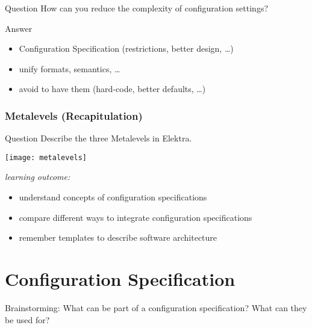 \begin{frame}
	\begin{alertblock}{Question}
	How can you reduce the complexity of configuration settings?
	\end{alertblock}

	\pause
	\begin{exampleblock}{Answer}
	\begin{itemize}
	\item Configuration Specification (restrictions, better design, \dots)
	\item unify formats, semantics, \dots
	\item avoid to have them (hard-code, better defaults, \dots)
	\end{itemize}
	\end{exampleblock}
\end{frame}

\begin{frame}
	\frametitle{Metalevels (Recapitulation)}
	\begin{alertblock}{Question}
	Describe the three Metalevels in Elektra.
	\end{alertblock}

	\pause
	\texttt{[image: metalevels]}
\end{frame}


\begin{frame}
	\textit{learning outcome:}
	\begin{itemize}
		\item understand concepts of configuration specifications
		\item compare different ways to integrate configuration specifications
		\item remember templates to describe software architecture
	\end{itemize}
\end{frame}


\section{Configuration Specification}

\begin{assignment}
	\begin{task}
	Brainstorming: What can be part of a configuration specification?
	What can they be used for?
	\end{task}
\end{assignment}

